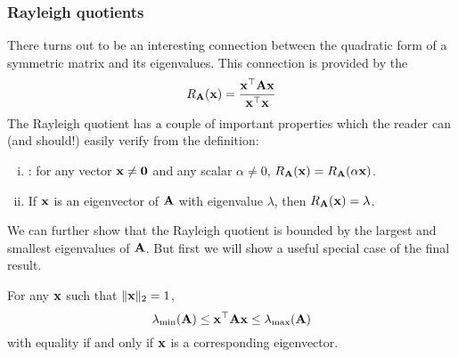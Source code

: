 \subsubsection{Rayleigh quotients}
There turns out to be an interesting connection between the quadratic form of a symmetric matrix and its eigenvalues.
This connection is provided by the 
\[R_{\mathbf{A}}(\mathbf{x}) = \frac{\mathbf{x}^\top\mathbf{A}\mathbf{x}}{\mathbf{x}^\top\mathbf{x}}\]
The Rayleigh quotient has a couple of important properties which the reader can (and should!) easily verify from the definition:
\begin{enumerate}[(i)]
\item {}: for any vector $\mathbf{x} \neq \mathbf{0}$ and any scalar $\alpha \neq 0$, $R_{\mathbf{A}}(\mathbf{x}) = R_{\mathbf{A}}(\alpha\mathbf{x})$.
\item If $\mathbf{x}$ is an eigenvector of $\mathbf{A}$ with eigenvalue $\lambda$, then $R_{\mathbf{A}}(\mathbf{x}) = \lambda$.
\end{enumerate}
We can further show that the Rayleigh quotient is bounded by the largest and smallest eigenvalues of $\mathbf{A}$.
But first we will show a useful special case of the final result.
\begin{proposition}
For any $\mathbf{x}$ such that $\|\mathbf{x}\|_2 = 1$,
\[\lambda_{\min}(\mathbf{A}) \leq \mathbf{x}^\top\mathbf{A}\mathbf{x} \leq \lambda_{\max}(\mathbf{A})\]
with equality if and only if $\mathbf{x}$ is a corresponding eigenvector.
\end{proposition}
